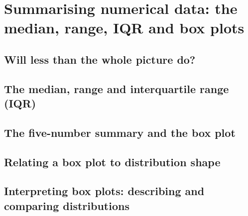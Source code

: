 \documentclass[a4paper,11pt]{article}
\begin{document}
\section{Summarising numerical data: the median, range, IQR and box plots}
\begin{outline}

\0
\subsection{Will less than the whole picture do?}

\0
\subsection{The median, range and interquartile range (IQR)}

\0
\subsection{The five-number summary and the box plot}

\0
\subsection{Relating a box plot to distribution shape}

\0
\subsection{Interpreting box plots: describing and comparing distributions}

\end{outline}

\newpage
\end{document}
